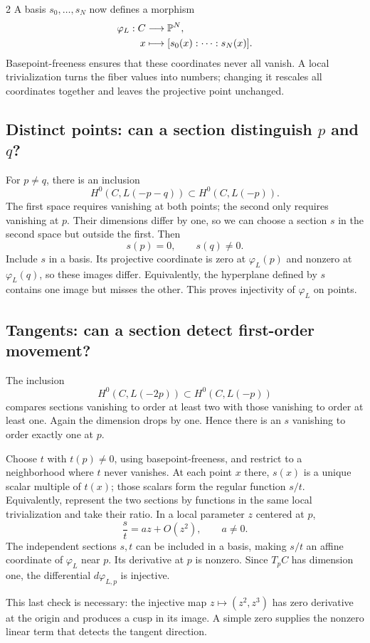 \documentclass[12pt]{memoir}
\begin{document}
\begin{multicols}{2}
A basis $s_0,\ldots,s_N$ now defines a morphism
\[
\begin{aligned}
 \varphi_L:C&\longrightarrow\mathbb{P}^N,\\
 x&\longmapsto[s_0(x):\cdots:s_N(x)].
\end{aligned}
\]
Basepoint-freeness ensures that these coordinates never all vanish.
A local trivialization turns the fiber values into numbers; changing
it rescales all coordinates together and leaves the projective
point unchanged.

\subsection{Distinct points: can a section distinguish $p$ and $q$?}
For $p\ne q$, there is an inclusion
\[
 H^0(C,L(-p-q))\subset H^0(C,L(-p)).
\]
The first space requires vanishing at both points; the second only
requires vanishing at $p$. Their dimensions differ by one, so we can
choose a section $s$ in the second space but outside the first. Then
\[
 s(p)=0,\qquad s(q)\ne0.
\]
Include $s$ in a basis. Its projective coordinate is zero at
$\varphi_L(p)$ and nonzero at $\varphi_L(q)$, so these images differ.
Equivalently, the hyperplane defined by $s$ contains one image but
misses the other. This proves injectivity of $\varphi_L$ on points.

\subsection{Tangents: can a section detect first-order movement?}
The inclusion
\[
 H^0(C,L(-2p))\subset H^0(C,L(-p))
\]
compares sections vanishing to order at least two with those
vanishing to order at least one. Again the dimension drops by one.
Hence there is an $s$ vanishing to order exactly one at $p$.

Choose $t$ with $t(p)\ne0$, using basepoint-freeness, and restrict
to a neighborhood where $t$ never vanishes. At each point $x$ there,
$s(x)$ is a unique scalar multiple of $t(x)$; those scalars form
the regular function $s/t$. Equivalently, represent the two sections
by functions in the same local trivialization and take their ratio.
In a local parameter $z$ centered at $p$,
\[
 \frac{s}{t}=az+O(z^2),\qquad a\ne0.
\]
The independent sections $s,t$ can be included in a basis, making
$s/t$ an affine coordinate of $\varphi_L$ near $p$. Its derivative
at $p$ is nonzero. Since $T_pC$ has dimension one, the differential
$d\varphi_{L,p}$ is injective.

This last check is necessary: the injective map
$z\mapsto(z^2,z^3)$ has zero derivative at the origin and produces a
cusp in its image. A simple zero supplies the nonzero linear term
that detects the tangent direction.


\end{multicols}
\end{document}
